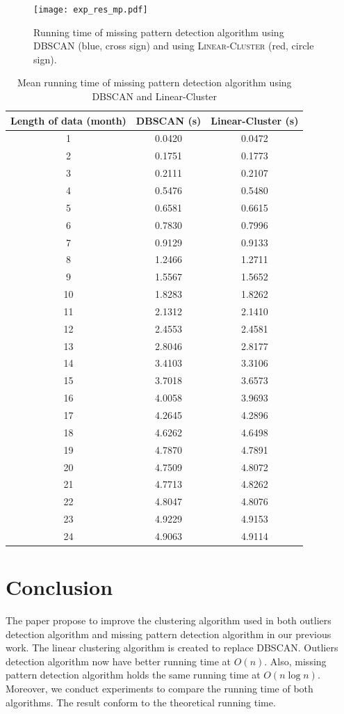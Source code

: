 \documentclass[conference]{IEEEtran}
\begin{document}
\begin{figure}
  \texttt{[image: exp\_res\_mp.pdf]}
  \caption{Running time of missing pattern detection algorithm using \textsc{DBSCAN} (blue, cross sign) and using \textsc{Linear-Cluster} (red, circle sign).}
  \label{fig:res_mp}
\end{figure}

\begin{table}
\caption{Mean running time of missing pattern detection algorithm using DBSCAN and Linear-Cluster}
\label{table:table_mp}
\centering
\begin{tabular}{ccc}
\hline
\textbf{Length of data} (month) & \textbf{DBSCAN} (s) & \textbf{Linear-Cluster} (s)\\
 \hline
 1&0.0420&0.0472\\
 \hline
 2&0.1751&0.1773\\
 \hline
 3&0.2111&0.2107\\
 \hline
 4&0.5476&0.5480\\
 \hline
 5&0.6581&0.6615\\
 \hline
 6&0.7830&0.7996\\
 \hline
 7&0.9129&0.9133\\
 \hline
 8&1.2466&1.2711\\
 \hline
 9&1.5567&1.5652\\
\hline
10&1.8283&1.8262\\
\hline
11&2.1312&2.1410\\
\hline
12&2.4553&2.4581\\
\hline
13&2.8046&2.8177\\
\hline
14&3.4103&3.3106\\
\hline
15&3.7018&3.6573\\
\hline
16&4.0058&3.9693\\
\hline
17&4.2645&4.2896\\
\hline
18&4.6262&4.6498\\
\hline
19&4.7870&4.7891\\
\hline
20&4.7509&4.8072\\
\hline
21&4.7713&4.8262\\
\hline
22&4.8047&4.8076\\
\hline
23&4.9229&4.9153\\
\hline
24&4.9063&4.9114\\
\hline
\end{tabular} 
\end{table}

\section{Conclusion} \label{sec:conclusion}
The paper propose to improve the clustering algorithm used in both outliers detection algorithm and missing pattern detection algorithm in our previous work. The linear clustering algorithm is created to replace DBSCAN. Outliers detection algorithm now have better running time at $O(n)$. Also, missing pattern detection algorithm holds the same running time at $O(n \log{n})$. Moreover, we conduct experiments to compare the running time of both algorithms. The result conform to the theoretical running time.



\end{document}
